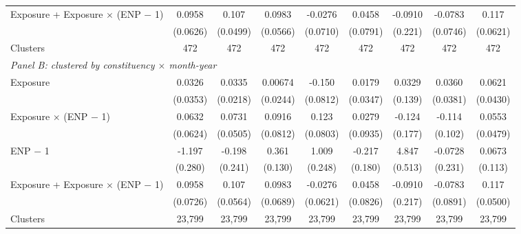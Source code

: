 {\begin{tabular}{l*{8}{c}}
Exposure + Exposure $\times$ (ENP $-$ 1)&      0.0958         &0.107\sym{**}         &0.0983\sym{*}         &     -0.0276         &      0.0458         &     -0.0910         &     -0.0783         &0.117\sym{*}         \\
            &    (0.0626)         &    (0.0499)         &    (0.0566)         &    (0.0710)         &    (0.0791)         &     (0.221)         &    (0.0746)         &    (0.0621)         \\
Clusters    &         472         &         472         &         472         &         472         &         472         &         472         &         472         &         472         \\
\midrule

\multicolumn{9}{l}{\textit{Panel B: clustered by constituency $\times$ month-year}} \\
Exposure    &      0.0326         &      0.0335         &     0.00674         &      -0.150\sym{*}  &      0.0179         &      0.0329         &      0.0360         &      0.0621         \\
            &    (0.0353)         &    (0.0218)         &    (0.0244)         &    (0.0812)         &    (0.0347)         &     (0.139)         &    (0.0381)         &    (0.0430)         \\
Exposure $\times$ (ENP $-$ 1)&      0.0632         &      0.0731         &      0.0916         &       0.123         &      0.0279         &      -0.124         &      -0.114         &      0.0553         \\
            &    (0.0624)         &    (0.0505)         &    (0.0812)         &    (0.0803)         &    (0.0935)         &     (0.177)         &     (0.102)         &    (0.0479)         \\
ENP $-$ 1   &      -1.197\sym{***}&      -0.198         &       0.361\sym{***}&       1.009\sym{***}&      -0.217         &       4.847\sym{***}&     -0.0728         &      0.0673         \\
            &     (0.280)         &     (0.241)         &     (0.130)         &     (0.248)         &     (0.180)         &     (0.513)         &     (0.231)         &     (0.113)         \\

Exposure + Exposure $\times$ (ENP $-$ 1)&      0.0958         &0.107\sym{*}         &      0.0983         &     -0.0276         &      0.0458         &     -0.0910         &     -0.0783         &0.117\sym{**}         \\
            &    (0.0726)         &    (0.0564)         &    (0.0689)         &    (0.0621)         &    (0.0826)         &     (0.217)         &    (0.0891)         &    (0.0500)         \\
Clusters    &      23,799         &      23,799         &      23,799         &      23,799         &      23,799         &      23,799         &      23,799         &      23,799         \\
\midrule


\end{tabular}}
